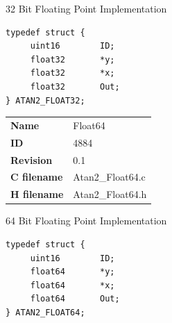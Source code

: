 32 Bit Floating Point Implementation

\begin{lstlisting}
typedef struct {
     uint16        ID;
     float32       *y;
     float32       *x;
     float32       Out;
} ATAN2_FLOAT32;
\end{lstlisting}

\ifdefined \AddTestReports
{}
\fi
{}
\nopagebreak[0]
\begin{tabular}{l l}
\textbf{Name} & Float64 \tabularnewline
\textbf{ID} & 4884 \tabularnewline
\textbf{Revision} & 0.1 \tabularnewline
\textbf{C filename} & Atan2\_Float64.c \tabularnewline
\textbf{H filename} & Atan2\_Float64.h \tabularnewline
\end{tabular}
\vspace{1ex}

64 Bit Floating Point Implementation

\begin{lstlisting}
typedef struct {
     uint16        ID;
     float64       *y;
     float64       *x;
     float64       Out;
} ATAN2_FLOAT64;
\end{lstlisting}

\ifdefined \AddTestReports
{}
\fi
